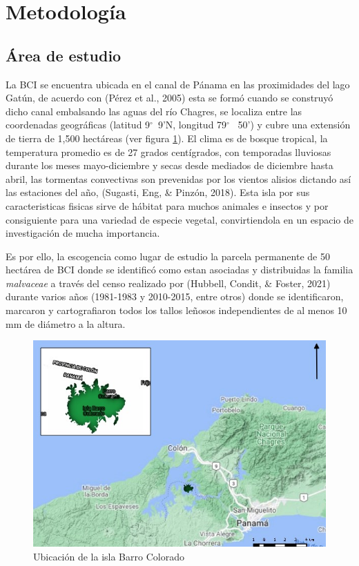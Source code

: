 \documentclass[11pt,]{article}
\begin{document}
\section{Metodología}\label{metodologuxeda}

\subsection{Área de estudio}\label{uxe1rea-de-estudio}

La BCI se encuentra ubicada en el canal de Pánama en las proximidades
del lago Gatún, de acuerdo con (Pérez et al., 2005) esta se formó cuando
se construyó dicho canal embalsando las aguas del río Chagres, se
localiza entre las coordenadas geográficas (latitud 9\(^\circ\)~9'N,
longitud 79\(^\circ\)~ 50') y cubre una extensión de tierra de 1,500
hectáreas (ver figura \ref{mapa}). El clima es de bosque tropical, la
temperatura promedio es de 27 grados centígrados, con temporadas
lluviosas durante los meses mayo-diciembre y secas desde mediados de
diciembre hasta abril, las tormentas convectivas son prevenidas por los
vientos alisios dictando así las estaciones del año, (Sugasti, Eng, \&
Pinzón, 2018). Esta isla por sus caracteristicas fisicas sirve de
hábitat para muchos animales e insectos y por consiguiente para una
variedad de especie vegetal, convirtiendola en un espacio de
investigación de mucha importancia.

Es por ello, la escogencia como lugar de estudio la parcela permanente
de 50 hectárea de BCI donde se identificó como estan asociadas y
distribuidas la familia \emph{malvaceae} a través del censo realizado
por (Hubbell, Condit, \& Foster, 2021) durante varios años (1981-1983 y
2010-2015, entre otros) donde se identificaron, marcaron y
cartografiaron todos los tallos leñosos independientes de al menos 10 mm
de diámetro a la altura.

\begin{figure}
\centering
\includegraphics{mapa_barro_colorado.jpeg}
\caption{Ubicación de la isla Barro Colorado\label{mapa}}
\end{figure}
\end{document}
